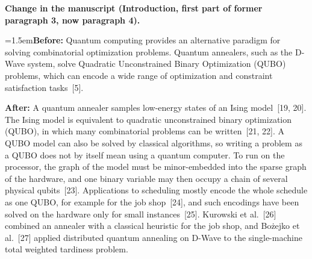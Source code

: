 \documentclass[12pt]{article}
\newcommand{\change}[3]{\par\smallskip\noindent\textbf{Change in the manuscript (#1).}\par
  {\leftskip=1.5em\noindent\textbf{Before:} #2\par\noindent\textbf{After:} #3\par}}
\begin{document}
\change{Introduction, first part of former paragraph 3, now paragraph 4}{Quantum computing provides an alternative paradigm for solving combinatorial optimization problems. Quantum annealers, such as the D-Wave system, solve Quadratic Unconstrained Binary Optimization (QUBO) problems, which can encode a wide range of optimization and constraint satisfaction tasks~[5].}{A quantum annealer samples low-energy states of an Ising model~[19, 20]. The Ising model is equivalent to quadratic unconstrained binary optimization (QUBO), in which many combinatorial problems can be written~[21, 22]. A QUBO model can also be solved by classical algorithms, so writing a problem as a QUBO does not by itself mean using a quantum computer. To run on the processor, the graph of the model must be minor-embedded into the sparse graph of the hardware, and one binary variable may then occupy a chain of several physical qubits~[23]. Applications to scheduling mostly encode the whole schedule as one QUBO, for example for the job shop~[24], and such encodings have been solved on the hardware only for small instances~[25]. Kurowski et al.~[26] combined an annealer with a classical heuristic for the job shop, and Bożejko et al.~[27] applied distributed quantum annealing on D-Wave to the single-machine total weighted tardiness problem.}
\end{document}
